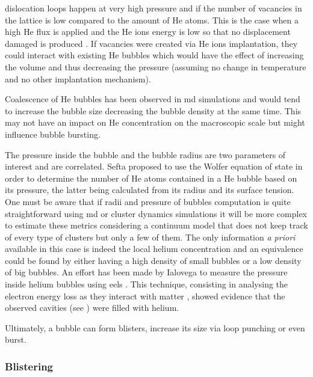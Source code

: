 \Glspl{dislocation loop} happen at very high pressure and if the number of vacancies in the \gls{lattice} is low compared to the amount of \gls{He} atoms.
This is the case when a high \gls{He} flux is applied and the \gls{He} ions energy is low so that no displacement damaged is produced \cite{sefta_surface_2013}.
If vacancies were created via \gls{He} ions implantation, they could interact with existing \gls{He} bubbles which would have the effect of increasing the volume and thus decreasing the pressure (assuming no change in temperature and no other implantation mechanism).

Coalescence of \gls{He} bubbles has been observed in \gls{md} simulations  and would tend to increase the bubble size decreasing the bubble density at the same time.
This may not have an impact on \gls{He} concentration on the macroscopic scale but might influence bubble bursting.

The pressure inside the bubble and the bubble radius are two parameters of interest and are correlated.
Sefta  proposed to use the Wolfer equation of state in order to determine the number of \gls{He} atoms contained in a \gls{He} bubble based on its pressure, the latter being calculated from its radius and its surface tension.
One must be aware that if radii and pressure of bubbles computation is quite straightforward using \gls{md}  or cluster dynamics  simulations it will be more complex to estimate these metrics considering a continuum model that does not keep track of every type of clusters but only a few of them.
The only information \textit{a priori} available in this case is indeed the local helium concentration and an equivalence could be found by either having a high density of small bubbles or a low density of big bubbles.
An effort has been made by Ialovega to measure the pressure inside helium bubbles using \gls{eels} .
This technique, consisting in analysing the electron energy loss as they interact with matter , showed evidence that the observed cavities (see ) were filled with helium.

Ultimately, a bubble can form blisters, increase its size via \gls{loop punching} or even burst.

\subsubsection{Blistering}

